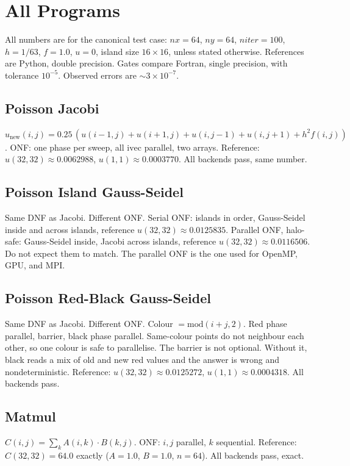 \documentclass[11pt]{article}
\begin{document}
\section{All Programs}
All numbers are for the canonical test case: $nx=64$, $ny=64$, $niter=100$,
$h=1/63$, $f=1.0$, $u=0$, island size $16 \times 16$, unless stated otherwise.
References are Python, double precision. Gates compare Fortran, single
precision, with tolerance $10^{-5}$. Observed errors are $\sim 3 \times 10^{-7}$.

\subsection{Poisson Jacobi}
$u_{\mathrm{new}}(i,j) = 0.25\,(u(i-1,j)+u(i+1,j)+u(i,j-1)+u(i,j+1)+h^2 f(i,j))$.
ONF: one phase per sweep, all $\mathrm{ivec}$ parallel, two arrays.
Reference: $u(32,32) \approx 0.0062988$, $u(1,1) \approx 0.0003770$.
All backends pass, same number.

\subsection{Poisson Island Gauss-Seidel}
Same DNF as Jacobi. Different ONF. Serial ONF: islands in order,
Gauss-Seidel inside and across islands, reference $u(32,32) \approx 0.0125835$.
Parallel ONF, halo-safe: Gauss-Seidel inside, Jacobi across islands,
reference $u(32,32) \approx 0.0116506$. Do not expect them to match.
The parallel ONF is the one used for OpenMP, GPU, and MPI.

\subsection{Poisson Red-Black Gauss-Seidel}
Same DNF as Jacobi. Different ONF. Colour $= \mathrm{mod}(i+j,2)$.
Red phase parallel, barrier, black phase parallel. Same-colour points do
not neighbour each other, so one colour is safe to parallelise. The barrier
is not optional. Without it, black reads a mix of old and new red values
and the answer is wrong and nondeterministic.
Reference: $u(32,32) \approx 0.0125272$, $u(1,1) \approx 0.0004318$.
All backends pass.

\subsection{Matmul}
$C(i,j) = \sum_k A(i,k) \cdot B(k,j)$. ONF: $i,j$ parallel, $k$ sequential.
Reference: $C(32,32) = 64.0$ exactly ($A=1.0$, $B=1.0$, $n=64$).
All backends pass, exact.
\end{document}
